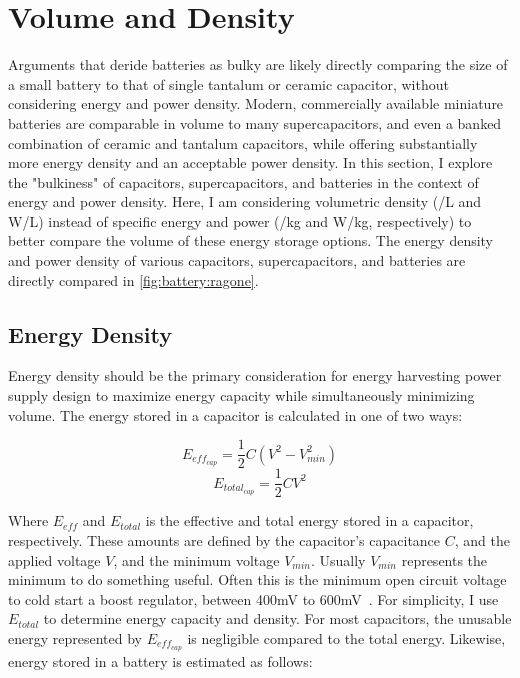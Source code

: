 \section{Volume and Density}
\label{sec:battery:density}
Arguments that deride batteries as bulky are likely directly comparing the size of a small battery to that of single tantalum or ceramic capacitor, without considering energy and power density. Modern, commercially available miniature batteries are comparable in volume to many supercapacitors, and even a banked combination of ceramic and tantalum capacitors, while offering substantially more energy density and an acceptable power density. In this section, I explore the "bulkiness" of capacitors, supercapacitors, and batteries in the context of energy and power density. Here, I am considering volumetric density (\si[per-mode=symbol]{\Wh\per\liter}  and  \si[per-mode=symbol]{\watt\per\liter}) instead of specific energy and power (\si[per-mode=symbol]{\Wh\per\kilo\gram} and  \si[per-mode=symbol]{\watt\per\kilo\gram}, respectively) to better compare the volume of these energy storage options. The energy density and power density of various capacitors, supercapacitors, and batteries are directly compared in \cref{fig:battery:ragone}.


\subsection{Energy Density}
Energy density should be the primary consideration for energy harvesting power supply design to maximize energy capacity while simultaneously minimizing volume. 
The energy stored in a capacitor is calculated in one of two ways:

$$E_{eff_{cap}} = \frac{1}{2} C (V^2 - V_{min}^2)$$
$$E_{total_{cap}} = \frac{1}{2} C V^2$$

\noindent Where $E_{eff}$ and $E_{total}$ is the effective and total energy stored in a capacitor, respectively. These amounts are defined by the capacitor's capacitance $C$, and the applied voltage $V$, and the minimum voltage $V_{min}$. Usually $V_{min}$ represents the minimum to do something useful. Often this is the minimum open circuit voltage to cold start a boost regulator, between 400\si{\milli\volt} to 600\si{\milli\volt}~\cite{adp5091,bq25505,max17222}. 
For simplicity, I use $E_{total}$ to determine energy capacity and density. For most capacitors, the unusable energy represented by $E_{eff_{cap}}$ is negligible compared to the total energy. Likewise, energy stored in a battery is estimated as follows:

